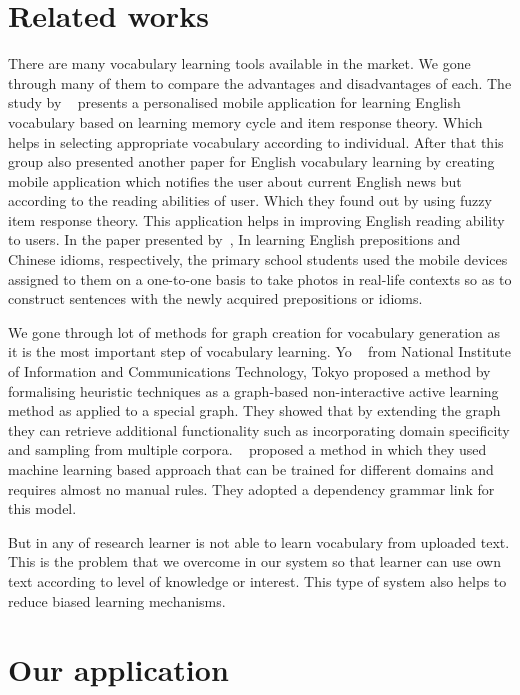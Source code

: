 \documentclass[11pt,a4paper]{article}
\begin{document}
\section{Related works}
There are many vocabulary learning tools available in the market.
We gone through many of them to compare the advantages and disadvantages of each.
The study by ~\citet{chen2008personalized} presents a personalised mobile application for
learning English vocabulary based on learning memory cycle and item response theory.
Which helps in selecting appropriate vocabulary according to individual.
After that this group also presented another paper for English vocabulary
learning by creating mobile application which notifies the user about current
English news but according to the reading abilities of user. Which they found out
by using fuzzy item response theory. This application helps in improving English reading ability to users.
In the paper presented by~\citet{wong2010mobile}, In learning English prepositions and Chinese idioms, respectively,
the primary school students used the mobile devices assigned to them on a one-to-one basis
to take photos in real-life contexts so as to construct sentences with the newly acquired prepositions or idioms.

We gone through lot of methods for graph creation for vocabulary generation as it is the most important step of vocabulary learning. Yo ~\citet{ehara2014formalizing}  from National Institute of Information and Communications Technology, Tokyo proposed a method by formalising heuristic techniques as a graph-based non-interactive active learning method as applied to a special graph. They showed that by extending the graph they can retrieve additional functionality such as incorporating domain specificity and sampling from multiple corpora.
~\citet{zhang2001learning} proposed a method in which they used machine learning based approach that can be trained for different domains and requires almost no manual rules. They adopted a dependency grammar link for this model. 

But in any of research learner is not able to learn vocabulary from uploaded text. This is the problem that we overcome in our system so that learner can use own text according to level of knowledge or interest. This type of system also helps to reduce biased learning mechanisms.  


\section{Our application}
\end{document}

